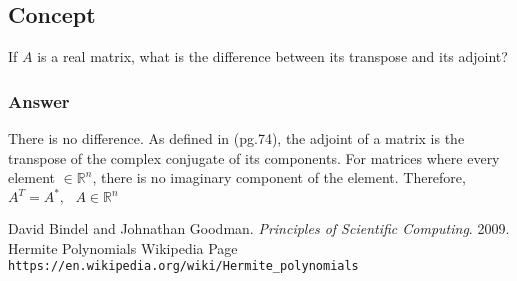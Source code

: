 \documentclass{article}
\begin{document}
		\subsection{Concept}
		If $A$ is a real matrix, what is the difference between its transpose and its adjoint?
		
		\subsubsection{Answer}
		There is no difference.  As defined in \cite{BG} (pg.74), the adjoint of a matrix is the transpose of the complex conjugate of its components.  For matrices where every element $\in\mathbb{R}^{n}$, there is no imaginary component of the element.  Therefore, $A^{T}=A^{*},\text{ }A\in\mathbb{R}^{n}$
		
\begin{thebibliography}{2}
	David Bindel and Johnathan Goodman.
	\textit{Principles of Scientific Computing}. 
	2009.
	Hermite Polynomials Wikipedia Page
	\\\texttt{https://en.wikipedia.org/wiki/Hermite\_polynomials}
\end{thebibliography}
\end{document}
